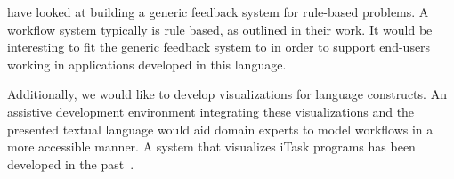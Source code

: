 \citet{DBLP:conf/sfp/NausJ16} have looked at building a generic feedback system for rule-based problems.
A workflow system typically is rule based, as outlined in their work.
It would be interesting to fit the generic feedback system to \TOPHAT in order to support end-users working in applications developed in this language.

Additionally, we would like to develop visualizations for \TOPHAT language constructs.
An assistive development environment integrating these visualizations and the presented textual language
would aid domain experts to model workflows in a more accessible manner.
A system that visualizes iTask programs has been developed in the past~\cite{DBLP:conf/sfp/StutterheimPA14}.

